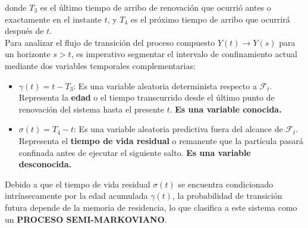 \begin{center}
\end{center}
donde $T_3$ es el último tiempo de arribo de renovación que ocurrió antes o exactamente en el instante $t$, y $T_4$ es el próximo tiempo de arribo que ocurrirá después de $t$. \\

\noindent 
Para analizar el flujo de transición del proceso compuesto $Y(t) \longrightarrow Y(s)$ para un horizonte $s > t$, es imperativo segmentar el intervalo de confinamiento actual mediante dos variables temporales complementarias:
\begin{itemize}
    \item $\gamma(t) = t - T_3$: Es una variable aleatoria determinista respecto a $\mathcal{F}_t$. Representa la \textbf{edad} o el tiempo transcurrido desde el último punto de renovación del sistema hasta el presente $t$. \textbf{Es una variable conocida.}
    \item $\sigma(t) = T_4 - t$: Es una variable aleatoria predictiva fuera del alcance de $\mathcal{F}_t$. Representa el \textbf{tiempo de vida residual} o remanente que la partícula pasará confinada antes de ejecutar el siguiente salto. \textbf{Es una variable desconocida.}
\end{itemize}

\noindent Debido a que el tiempo de vida residual $\sigma(t)$ se encuentra condicionado intrínsecamente por la edad acumulada $\gamma(t)$, la probabilidad de transición futura depende de la memoria de residencia, lo que clasifica a este sistema como un \textbf{PROCESO SEMI-MARKOVIANO}.

